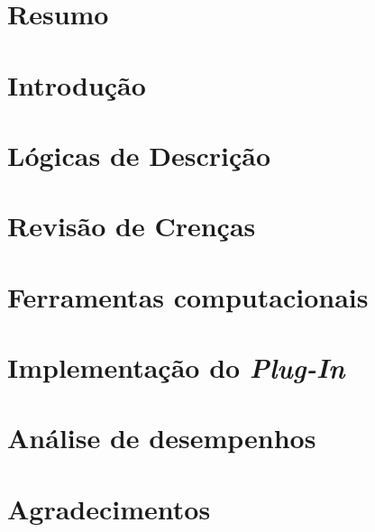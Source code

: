 \documentclass[12pt, a4paper]{report}
\begin{document}
	
	\chapter*{Resumo}
	\chapter*{Introdução}
	
	
	
	\chapter{Lógicas de Descrição}
	\chapter{Revisão de Crenças}
	\chapter{Ferramentas computacionais}
	\chapter{Implementação do \textit{Plug-In}}
	\chapter{Análise de desempenhos}
	\chapter*{Agradecimentos}
	
	
	
	 
\end{document}
